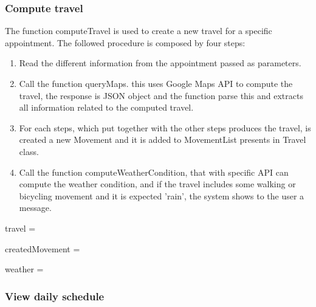 \subsubsection{Compute travel}

The function computeTravel is used to create a new travel for a specific appointment.
The followed procedure is composed by four steps:
\begin{enumerate}
	\item Read the different information from the appointment passed as parameters.
	\item Call the function queryMaps. this uses Google Maps API to compute the travel, the response is JSON object and the function parse this and extracts all information related to the computed travel.
	\item For each steps, which put together with the other steps produces the travel, is created a new Movement and it is added to MovementList presents in Travel class.
	\item Call the function computeWeatherCondition, that with specific API can compute the weather condition, and if the travel includes some walking or bicycling movement and it is expected 'rain', the system shows to the user a message.
\end{enumerate}

\begin{algorithmic}
		
		\State {}
		\State {}
		
		\State travel =  
		
			\State createdMovement = 
			\State {}
		\EndFor
		
		\State {}
		\State {}
		
		weather = 
			\State {}
		\EndIf
	\EndFunction
\end{algorithmic}


\subsubsection{View daily schedule}

